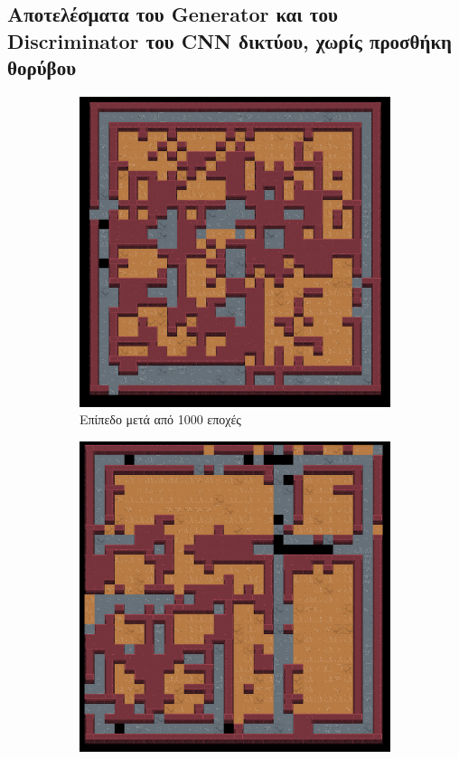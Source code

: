 \subsection{Αποτελέσματα του Generator και του Discriminator του CNN δικτύου, χωρίς προσθήκη θορύβου}
\begin{figure}[H]
\begin{subfigure}{.5\textwidth}
  \centering
  \includegraphics[width=.8\linewidth]{../images/result_images/cnn-gan/combined_1000.png}
  \caption{Επίπεδο μετά από 1000 εποχές}
  \label{fig:sfig1}
\end{subfigure}%
\begin{subfigure}{.5\textwidth}
  \centering
  \includegraphics[width=.8\linewidth]{../images/result_images/cnn-gan/combined_3000.png}

\end{subfigure}
\end{figure}
